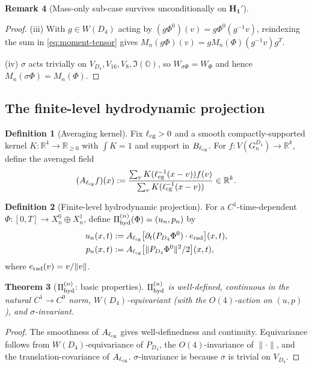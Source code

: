 \documentclass[11pt, a4paper]{amsart}
\newtheorem{theorem}{Theorem}[section]
\theoremstyle{definition}
\newtheorem{definition}[theorem]{Definition}
\newtheorem{remark}[theorem]{Remark}
\newcommand{\R}{\mathbb{R}}
\newcommand{\OO}{\mathbb{O}}
\newcommand{\hyd}{{\rm hyd}}
\begin{document}
\begin{remark}[Mass-only sub-case survives unconditionally on $\mathbf{H_1'}$]
\begin{proof}
(iii) With $g \in W(D_4)$ acting by $(g\Phi^0)(v) = g\Phi^0(g^{-1}v)$,
reindexing the sum in \eqref{eq:moment-tensor} gives
$M_n(g\Phi)(v) = g M_n(\Phi)(g^{-1}v) g^T$.

(iv) $\sigma$ acts trivially on $V_{D_4}, V_{16}, V_8, \Im(\OO)$, so
$W_{\sigma\Phi} = W_\Phi$ and hence $M_n(\sigma\Phi) = M_n(\Phi)$.
\end{proof}

\subsection{The finite-level hydrodynamic projection}
\label{subsec:pihyd-n}

\begin{definition}[Averaging kernel]
\label{def:avg-kernel}
Fix $\ell_{\rm cg} > 0$ and a smooth compactly-supported kernel
$K \colon \R^4 \to \R_{\geq 0}$ with $\int K = 1$ and support in
$B_{\ell_{\rm cg}}$. For $f \colon V(G_n^{D_4}) \to \R^k$,
define the averaged field
\[
  (A_{\ell_{\rm cg}} f)(x)
  := \frac{\sum_v K(\ell_{\rm cg}^{-1}(x - v)) f(v)}
       {\sum_v K(\ell_{\rm cg}^{-1}(x - v))}
  \in \R^k.
\]
\end{definition}

\begin{definition}[Finite-level hydrodynamic projection]
\label{def:pihyd-n}
For a $C^1$-time-dependent $\Phi \colon [0, T] \to X_n^0 \oplus
X_n^1$, define $\Pi_{\hyd}^{(n)}(\Phi) = (u_n, p_n)$ by
\begin{align*}
  u_n(x, t) &:= A_{\ell_{\rm cg}} \big[\partial_t (P_{D_4}\Phi^0)
    \cdot e_{\rm rad}\big](x, t), \\
  p_n(x, t) &:= A_{\ell_{\rm cg}} \big[ \|P_{D_4} \Phi^0\|^2/2 \big](x, t),
\end{align*}
where $e_{\rm rad}(v) = v/\|v\|$.
\end{definition}

\begin{theorem}[$\Pi_{\hyd}^{(n)}$: basic properties]
\label{thm:pihyd-n}
$\Pi_{\hyd}^{(n)}$ is well-defined, continuous in the natural
$C^1 \to C^0$ norm, $W(D_4)$-equivariant (with the $O(4)$-action
on $(u, p)$), and $\sigma$-invariant.
\end{theorem}

\begin{proof}
The smoothness of $A_{\ell_{\rm cg}}$ gives well-definedness and
continuity. Equivariance follows from $W(D_4)$-equivariance of
$P_{D_4}$, the $O(4)$-invariance of $\|\cdot\|$, and the
translation-covariance of $A_{\ell_{\rm cg}}$. $\sigma$-invariance
is because $\sigma$ is trivial on $V_{D_4}$.
\end{proof}


\end{remark}
\end{document}
